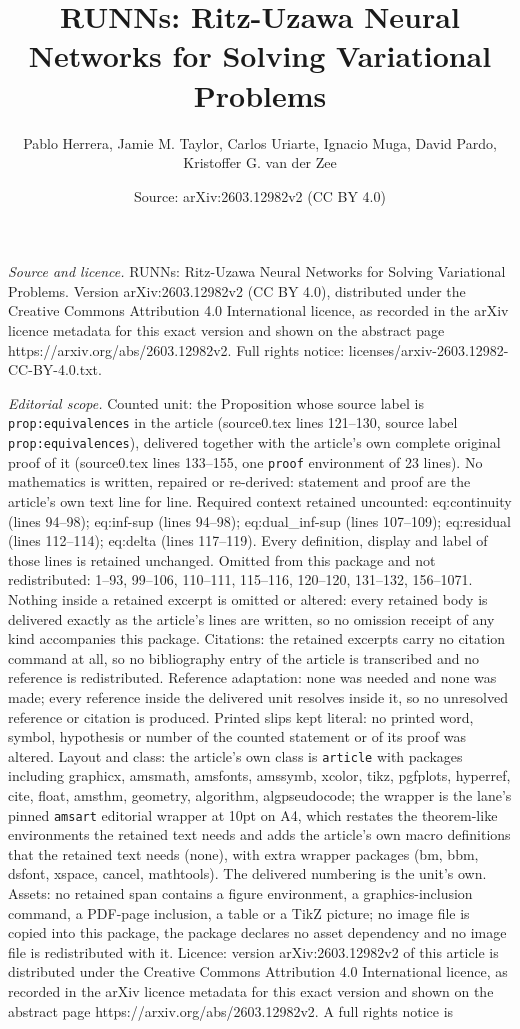 \documentclass[10pt,a4paper]{amsart}
\title[RUNNs: Ritz-Uzawa Neural Networks for Solving Variational Pr]{RUNNs: Ritz-Uzawa Neural Networks for Solving Variational Problems}
\author{Pablo Herrera, Jamie M. Taylor, Carlos Uriarte, Ignacio Muga, David Pardo, Kristoffer G. van der Zee}
\date{Source: arXiv:2603.12982v2 (CC BY 4.0)}
\begin{document}
\maketitle

\noindent\emph{Source and licence.} RUNNs: Ritz-Uzawa Neural Networks for Solving Variational Problems. Version arXiv:2603.12982v2 (CC BY 4.0), distributed under the Creative Commons Attribution 4.0 International licence, as recorded in the arXiv licence metadata for this exact version and shown on the abstract page https://arxiv.org/abs/2603.12982v2. Full rights notice: licenses/arxiv-2603.12982-CC-BY-4.0.txt.\par\smallskip

\noindent\textit{Editorial scope.} Counted unit: the Proposition whose source label is \texttt{prop:equivalences} in the article (source0.tex lines 121--130, source label \texttt{prop:equivalences}), delivered together with the article's own complete original proof of it (source0.tex lines 133--155, one \texttt{proof} environment of 23 lines). No mathematics is written, repaired or re-derived: statement and proof are the article's own text line for line. Required context retained uncounted: eq:continuity (lines 94--98); eq:inf-sup (lines 94--98); eq:dual\_inf-sup (lines 107--109); eq:residual (lines 112--114); eq:delta (lines 117--119). Every definition, display and label of those lines is retained unchanged. Omitted from this package and not redistributed: 1--93, 99--106, 110--111, 115--116, 120--120, 131--132, 156--1071. Nothing inside a retained excerpt is omitted or altered: every retained body is delivered exactly as the article's lines are written, so no omission receipt of any kind accompanies this package. Citations: the retained excerpts carry no citation command at all, so no bibliography entry of the article is transcribed and no reference is redistributed. Reference adaptation: none was needed and none was made; every reference inside the delivered unit resolves inside it, so no unresolved reference or citation is produced. Printed slips kept literal: no printed word, symbol, hypothesis or number of the counted statement or of its proof was altered. Layout and class: the article's own class is \texttt{article} with packages including graphicx, amsmath, amsfonts, amssymb, xcolor, tikz, pgfplots, hyperref, cite, float, amsthm, geometry, algorithm, algpseudocode; the wrapper is the lane's pinned \texttt{amsart} editorial wrapper at 10pt on A4, which restates the theorem-like environments the retained text needs and adds the article's own macro definitions that the retained text needs (none), with extra wrapper packages (bm, bbm, dsfont, xspace, cancel, mathtools). The delivered numbering is the unit's own. Assets: no retained span contains a figure environment, a graphics-inclusion command, a PDF-page inclusion, a table or a TikZ picture; no image file is copied into this package, the package declares no asset dependency and no image file is redistributed with it. Licence: version arXiv:2603.12982v2 of this article is distributed under the Creative Commons Attribution 4.0 International licence, as recorded in the arXiv licence metadata for this exact version and shown on the abstract page https://arxiv.org/abs/2603.12982v2. A full rights notice is 
\end{document}
